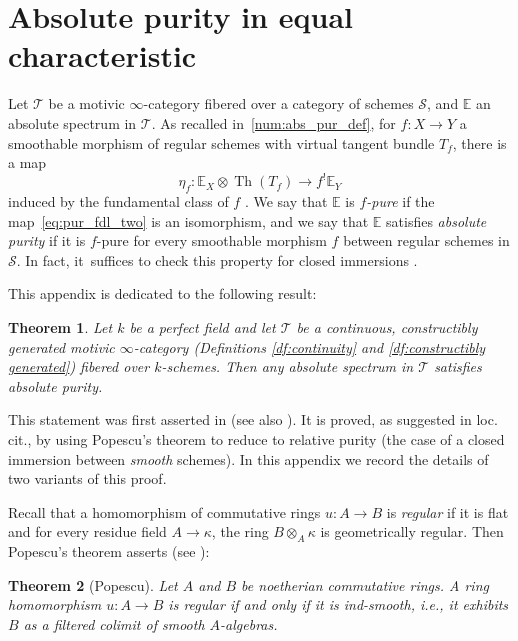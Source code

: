 \documentclass[11pt]{article}
\newcommand{\ie}{i.e.,\xspace}
\numberwithin{equation}{section}\renewcommand{\encodingdefault}{TU}
\newcommand{\base}{\mathscr S}
\newcommand{\T}{\mathscr T}
\newcommand{\E}{\mathbb E}
\DeclareMathOperator{\Th}{Th}
\newtheorem{thm}{Theorem}[section]
\theoremstyle{remark}
\theoremstyle{definition}
\numberwithin{equation}{thm}
\begin{document}
\section{Absolute purity in equal characteristic}
\label{apd:popescu}

Let $\T$ be a motivic $\infty$-category fibered over a category of schemes $\base$, and $\E$ an absolute spectrum in $\T$.
As recalled in~\ref{num:abs_pur_def}, for $f:X\to Y$ a smoothable morphism of regular schemes with virtual tangent bundle $T_f$, there is a map
\begin{equation}
\label{eq:pur_fdl_two}
\eta_f:\E_X\otimes\Th(T_f)\to f^!\E_Y
\end{equation}
induced by the fundamental class of $f$ \cite[Def.\,4.3.7]{DJK}.
We say that $\E$ is \emph{$f$-pure} if the map~\eqref{eq:pur_fdl_two} is an isomorphism, and we say that $\E$ satisfies \emph{absolute purity} if it is $f$-pure for every smoothable morphism $f$ between regular schemes in $\base$.
In fact, it~suffices to check this property for closed immersions \cite[Rem.\,4.3.12(i)]{DJK}.

This appendix is dedicated to the following result:

\begin{thm}
\label{thm:abs_pur_eqchar}
Let $k$ be a perfect field and let $\T$ be a continuous, constructibly generated motivic $\infty$-category (Definitions \ref{df:continuity} and \ref{df:constructibly generated}) fibered over $k$-schemes.
Then any absolute spectrum in $\T$ satisfies absolute purity.
\end{thm}

This statement was first asserted in \cite[Ex.\,1.3.4(2)]{DegliseOrientation} (see also \cite[Prop.\,6.2]{CD5}).
It is proved, as suggested in loc.\,cit., by using Popescu's theorem to reduce to relative purity (the case of a closed immersion between \emph{smooth} schemes).
In this appendix we record the details of two variants of this proof.

Recall that a homomorphism of commutative rings $u:A\to B$ is \emph{regular} if it is flat and for every residue field $A \to \kappa$, the ring $B\otimes_A\kappa$ is geometrically regular. Then Popescu's theorem asserts (see \cite[Th.\,1.1]{Spivakovsky}):\enlargethispage{-\baselineskip}%

\begin{thm}[Popescu]
\label{thm:popescu}
Let $A$ and $B$ be noetherian commutative rings.
A ring homomorphism $u:A \to B$ is regular if and only if it is ind-smooth, \ie it exhibits $B$ as a filtered colimit of smooth $A$-algebras.
\end{thm}
\end{document}
